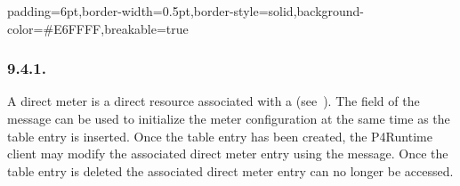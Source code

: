 \documentclass[11pt]{article}
\begin{document}
{%
\begin{mdbmargintb}{6pt}{6pt}%
\begin{mdblock}{padding=6pt,border-width=0.5pt,border-style=solid,background-color=\#E6FFFF,breakable=true}%
\begin{mdpre}%
\end{mdpre}%
\end{mdblock}%
\end{mdbmargintb}%

\subsubsection{9.4.1.\hspace*{0.5em}}\label{sec-directmeterentry}%

\noindent{}A direct meter is a direct resource associated with a  (see~). The  field of the 
message can be used to initialize the meter configuration at the same time as
the table entry is inserted. Once the table entry has been created, the
P4Runtime client may modify the associated direct meter entry using the
 message. Once the table entry is deleted the associated
direct meter entry can no longer be accessed.%

}
\end{document}
